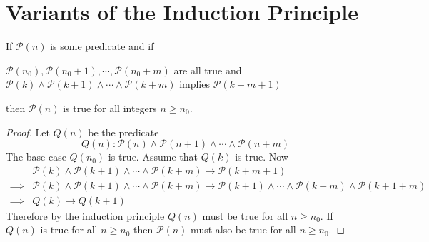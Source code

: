 \documentclass[11pt,numbers=noenddot,svgnames,dvipsnames]{scrartcl}
\begin{document}
\section{Variants of the Induction Principle}

\begin{theorem}\label{induction-mul-bases}
    If $\mathcal{P}(n)$ is some predicate and if 
    \begin{itemize}
        \ii $\mathcal{P}(n_{0}), \mathcal{P}(n_{0} + 1), \cdots, \mathcal{P}(n_{0} + m)$ are all true and 
        \ii $\mathcal{P}(k) \wedge \mathcal{P}(k + 1) \wedge \cdots \wedge \mathcal{P}(k + m)$ implies $\mathcal{P}(k + m + 1)$
    \end{itemize}
    then $\mathcal{P}(n)$ is true for all integers $n\geq n_{0}$.
\end{theorem}
\begin{proof}
    Let $Q(n)$ be the predicate
    \[
        Q(n) : \mathcal{P}(n) \wedge \mathcal{P}(n + 1) \wedge \cdots \wedge \mathcal{P}(n + m)
    \]
    The base case $Q(n_{0})$ is true. Assume that $Q(k)$ is true. Now 
    \begin{align*}
                 &\mathcal{P}(k) \wedge \mathcal{P}(k + 1) \wedge \cdots \wedge \mathcal{P}(k + m) 
                  \rightarrow \mathcal{P}(k + m + 1) \\
        \implies &\mathcal{P}(k) \wedge \mathcal{P}(k + 1) \wedge \cdots \wedge \mathcal{P}(k + m) 
        \rightarrow \mathcal{P}(k + 1) \wedge \cdots \wedge \mathcal{P}(k + m) \wedge \mathcal{P}(k + 1 + m) \\
        \implies & Q(k) \rightarrow Q(k + 1)
    \end{align*}
    Therefore by the induction principle $Q(n)$ must be true for all $n\geq n_{0}$. If $Q(n)$ is true for all 
    $n \geq n_{0}$ then $\mathcal{P}(n)$ must also be true for all $n\geq n_{0}$.
\end{proof}
\end{document}
